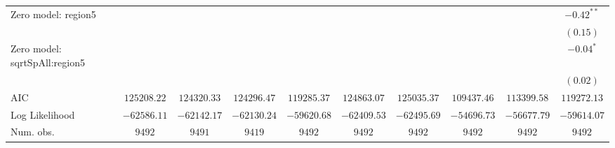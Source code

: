 \begin{center}
\begin{longtable}{l c c c c c c c c c}
Zero model: region5            &               &               &               &                 &               &                 &                 &               & $-0.42^{**}$  \\
                               &               &               &               &                 &               &                 &                 &               & $(0.15)$      \\
Zero model: sqrtSpAll:region5  &               &               &               &                 &               &                 &                 &               & $-0.04^{*}$   \\
                               &               &               &               &                 &               &                 &                 &               & $(0.02)$      \\
\midrule
AIC                            & $125208.22$   & $124320.33$   & $124296.47$   & $119285.37$     & $124863.07$   & $125035.37$     & $109437.46$     & $113399.58$   & $119272.13$   \\
Log Likelihood                 & $-62586.11$   & $-62142.17$   & $-62130.24$   & $-59620.68$     & $-62409.53$   & $-62495.69$     & $-54696.73$     & $-56677.79$   & $-59614.07$   \\
Num. obs.                      & $9492$        & $9491$        & $9419$        & $9492$          & $9492$        & $9492$          & $9492$          & $9492$        & $9492$        \\
\end{longtable}
\end{center}
